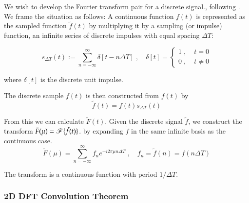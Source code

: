 We wish to develop the Fourier transform pair for a discrete signal., following \cite{DIPGW}. We frame the situation
as follows: A continuous function $f(t)$ is represented as the sampled function $\tilde{f}(t)$ by multiplying it by a sampling (or impulse) function, an infinite series of discrete impulses with equal spacing $\Delta T$:

\begin{equation} \label{1D-sampling-function}
s_{\Delta T}(t) := \sum_{n=-\infty}^{\infty} \delta[t - n\Delta T] \;,\quad
\delta[t] = \begin{cases} 1 \;,\; & t=0 \\ 0 \;,\;& t \ne 0 \end{cases}
\end{equation}

where $\delta[t]$ is the discrete unit impulse.

The discrete sample $f(t)$ is then constructed from $f(t)$ by
\begin{equation} \label{1D-discrete-sample}
\tilde{f}(t) = f(t) s_{\Delta T}(t)
\end{equation}

From this we can calculate $\tilde{F}(t)$.
Given the discrete signal $\tilde{f}$, we construct the transform
$\tilde{F}(\mu) = \operatorname{\mathscr{F}}\{\tilde{f}(t)\}$. by expanding $\tilde{f}$ in the same infinite basis as the continuous case.
\begin{equation} \label{1D-DFT-transform}
\tilde{F}(\mu) = \sum_{n=-\infty}^{\infty} f_n e^{-i 2\pi \mu n \Delta T} \;,\quad
f_n = \tilde{f}(n) = f(n\Delta T)
\end{equation}

The transform is a continuous function with period $1 / \Delta T$. 


\subsubsection{2D DFT Convolution Theorem}


